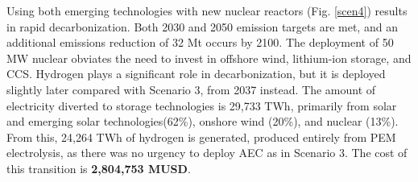 Using both emerging technologies with new nuclear reactors (Fig. \ref{scen4}) results in rapid decarbonization. Both 2030 and 2050 emission targets are met, and an additional emissions reduction of 32 Mt occurs by 2100. The deployment of 50 MW nuclear obviates the need to invest in offshore wind, lithium-ion storage, and \gls{CCS}. Hydrogen plays a significant role in decarbonization, but it is deployed slightly later compared with Scenario 3, from 2037 instead. The amount of electricity diverted to storage technologies is 29,733 TWh, primarily from solar and emerging solar technologies(62\%), onshore wind (20\%), and nuclear (13\%). From this, 24,264 TWh of hydrogen is generated, produced entirely from PEM electrolysis, as there was no urgency to deploy \gls{AEC} as in Scenario 3. The cost of this transition is \textbf{2,804,753 MUSD}.

